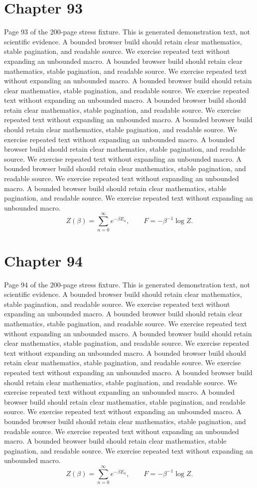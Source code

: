 \documentclass[11pt]{article}
\begin{document}
\section*{Chapter 93}
Page 93 of the 200-page stress fixture. This is generated demonstration text, not scientific evidence.
A bounded browser build should retain clear mathematics, stable pagination, and readable source. We exercise repeated text without expanding an unbounded macro.
A bounded browser build should retain clear mathematics, stable pagination, and readable source. We exercise repeated text without expanding an unbounded macro.
A bounded browser build should retain clear mathematics, stable pagination, and readable source. We exercise repeated text without expanding an unbounded macro.
A bounded browser build should retain clear mathematics, stable pagination, and readable source. We exercise repeated text without expanding an unbounded macro.
A bounded browser build should retain clear mathematics, stable pagination, and readable source. We exercise repeated text without expanding an unbounded macro.
A bounded browser build should retain clear mathematics, stable pagination, and readable source. We exercise repeated text without expanding an unbounded macro.
A bounded browser build should retain clear mathematics, stable pagination, and readable source. We exercise repeated text without expanding an unbounded macro.
A bounded browser build should retain clear mathematics, stable pagination, and readable source. We exercise repeated text without expanding an unbounded macro.
\[Z(\beta)=\sum_{n=0}^{\infty}e^{-\beta E_n},\qquad F=-\beta^{-1}\log Z.\]
\newpage
\section*{Chapter 94}
Page 94 of the 200-page stress fixture. This is generated demonstration text, not scientific evidence.
A bounded browser build should retain clear mathematics, stable pagination, and readable source. We exercise repeated text without expanding an unbounded macro.
A bounded browser build should retain clear mathematics, stable pagination, and readable source. We exercise repeated text without expanding an unbounded macro.
A bounded browser build should retain clear mathematics, stable pagination, and readable source. We exercise repeated text without expanding an unbounded macro.
A bounded browser build should retain clear mathematics, stable pagination, and readable source. We exercise repeated text without expanding an unbounded macro.
A bounded browser build should retain clear mathematics, stable pagination, and readable source. We exercise repeated text without expanding an unbounded macro.
A bounded browser build should retain clear mathematics, stable pagination, and readable source. We exercise repeated text without expanding an unbounded macro.
A bounded browser build should retain clear mathematics, stable pagination, and readable source. We exercise repeated text without expanding an unbounded macro.
A bounded browser build should retain clear mathematics, stable pagination, and readable source. We exercise repeated text without expanding an unbounded macro.
\[Z(\beta)=\sum_{n=0}^{\infty}e^{-\beta E_n},\qquad F=-\beta^{-1}\log Z.\]
\newpage
\end{document}
